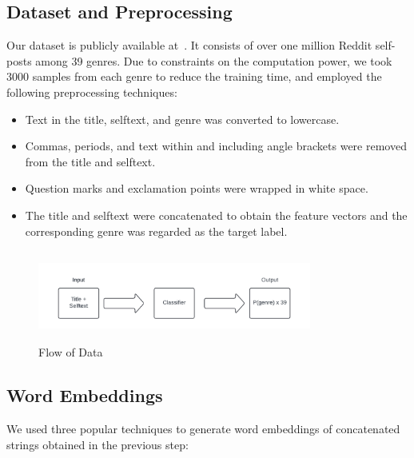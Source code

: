 \documentclass[conference]{IEEEtran}
\begin{document}
\subsection{Dataset and Preprocessing}
Our dataset is publicly available at~\cite{dataset}. It consists of over one million Reddit self-posts among 39 genres. Due to constraints on the computation power, we took 3000 samples from each genre to reduce the training time, and employed the following preprocessing techniques:
\begin{itemize}
    \item Text in the title, selftext, and genre was converted to lowercase.
    \item Commas, periods, and text within and including angle brackets were removed from the title and selftext.
    \item Question marks and exclamation points were wrapped in white space.
    \item The title and selftext were concatenated to obtain the feature vectors and the corresponding genre was regarded as the target label.
\end{itemize}

\begin{figure}[!htb]
\centering
\includegraphics[width=90mm, height = 30mm]{Images/DataPreprocessing.png}
\caption{Flow of Data}\label{fig:dataPreprocessing}
\end{figure}

\subsection{Word Embeddings}
We used three popular techniques to generate word embeddings of concatenated strings obtained in the previous step:
\end{document}
